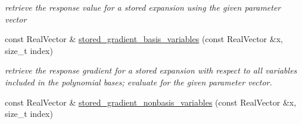 \begin{DoxyCompactItemize}
\begin{DoxyCompactList}\small\item\em retrieve the response value for a stored expansion using the given parameter vector \end{DoxyCompactList}\item 
const Real\+Vector \& \hyperlink{classPecos_1_1NodalInterpPolyApproximation_a7689fc058e2efdde6ce4dfe898864592}{stored\+\_\+gradient\+\_\+basis\+\_\+variables} (const Real\+Vector \&x, size\+\_\+t index)\label{classPecos_1_1NodalInterpPolyApproximation_a7689fc058e2efdde6ce4dfe898864592}

\begin{DoxyCompactList}\small\item\em retrieve the response gradient for a stored expansion with respect to all variables included in the polynomial bases; evaluate for the given parameter vector. \end{DoxyCompactList}\item 
const Real\+Vector \& \hyperlink{classPecos_1_1NodalInterpPolyApproximation_af0c9184d9a0da7b0e3d0d3ecbfc8f434}{stored\+\_\+gradient\+\_\+nonbasis\+\_\+variables} (const Real\+Vector \&x, size\+\_\+t index)\label{classPecos_1_1NodalInterpPolyApproximation_af0c9184d9a0da7b0e3d0d3ecbfc8f434}


\end{DoxyCompactItemize}
